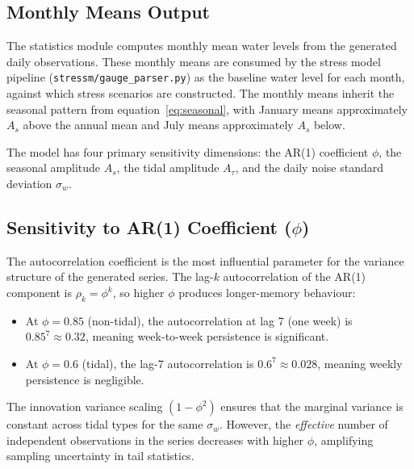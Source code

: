 \documentclass[11pt,a4paper]{article}
\begin{document}
\subsection{Monthly Means Output}

The statistics module computes monthly mean water levels from the generated daily
observations. These monthly means are consumed by the stress model pipeline
(\texttt{stressm/gauge\_parser.py}) as the baseline water level for each month,
against which stress scenarios are constructed. The monthly means inherit the
seasonal pattern from equation~\eqref{eq:seasonal}, with January means approximately
$A_s$ above the annual mean and July means approximately $A_s$ below.

\mkmsensitivity

The model has four primary sensitivity dimensions: the AR(1) coefficient $\phi$,
the seasonal amplitude $A_s$, the tidal amplitude $A_{\tau}$, and the daily noise
standard deviation $\sigma_w$.

\subsection{Sensitivity to AR(1) Coefficient ($\phi$)}

The autocorrelation coefficient is the most influential parameter for the variance
structure of the generated series. The lag-$k$ autocorrelation of the AR(1) component
is $\rho_k = \phi^k$, so higher $\phi$ produces longer-memory behaviour:

\begin{itemize}[nosep]
    \item At $\phi = 0.85$ (non-tidal), the autocorrelation at lag 7 (one week) is
          $0.85^7 \approx 0.32$, meaning week-to-week persistence is significant.
    \item At $\phi = 0.6$ (tidal), the lag-7 autocorrelation is $0.6^7 \approx 0.028$,
          meaning weekly persistence is negligible.
\end{itemize}

\noindent The innovation variance scaling $(1 - \phi^2)$ ensures that the marginal
variance is constant across tidal types for the same $\sigma_w$. However, the
\emph{effective} number of independent observations in the series decreases with
higher $\phi$, amplifying sampling uncertainty in tail statistics.
\end{document}
